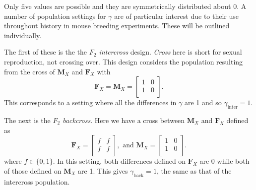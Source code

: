 \documentclass[sts]{imsart}
\newcommand{\m}[1]{\mathbf{#1}}               %
\begin{document}
Only five values are possible and they are symmetrically distributed about 0. A number of population settings for $\gamma$ are of particular interest due to their use throughout history in mouse breeding experiments. These will be outlined individually.

The first of these is the the \textit{$F_2$ intercross} design. \emph{Cross} here is short for sexual reproduction, not crossing over. This design considers the population resulting from the cross of $\m{M}_X$ and $\m{F}_X$ with
$$\m{F}_X = \m{M}_X = \begin{bmatrix}
  1 & 0 \\
  1 & 0 \\
\end{bmatrix}.$$
This corresponds to a setting where all the differences in $\gamma$ are 1 and so $\gamma_{\text{inter}} = 1$.

The next is the \textit{$F_2$ backcross}. Here we have a cross between $\m{M}_X$ and $\m{F}_X$ defined as
$$\m{F}_X = \begin{bmatrix}
  f & f \\
  f & f \\
\end{bmatrix}, \text{ and }
\m{M}_X = \begin{bmatrix}
  1 & 0 \\
  1 & 0 \\
\end{bmatrix}.$$
where $f \in \{0,1\}$. In this setting, both differences defined on $\m{F}_X$ are 0 while both of those defined on $\m{M}_X$ are 1. This gives $\gamma_{\text{back}} = 1$, the same as that of the intercross population.
\end{document}
